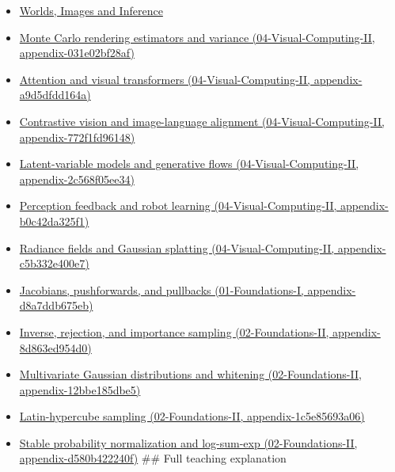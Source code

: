 \begin{itemize}
\item
  \href{Continuous\%20Notes/University\%20-\%20Worlds,\%20Images\%20and\%20Inference\%20-\%20Graphics,\%20Vision\%20and\%20Photography}{Worlds, Images and Inference}
\item
  \href{../04-Visual-Computing-II/main.pdf\#nameddest=appendix-031e02bf28af}{Monte Carlo rendering estimators and variance (04-Visual-Computing-II, appendix-031e02bf28af)}
\item
  \href{../04-Visual-Computing-II/main.pdf\#nameddest=appendix-a9d5dfdd164a}{Attention and visual transformers (04-Visual-Computing-II, appendix-a9d5dfdd164a)}
\item
  \href{../04-Visual-Computing-II/main.pdf\#nameddest=appendix-772f1fd96148}{Contrastive vision and image-language alignment (04-Visual-Computing-II, appendix-772f1fd96148)}
\item
  \href{../04-Visual-Computing-II/main.pdf\#nameddest=appendix-2c568f05ee34}{Latent-variable models and generative flows (04-Visual-Computing-II, appendix-2c568f05ee34)}
\item
  \href{../04-Visual-Computing-II/main.pdf\#nameddest=appendix-b0c42da325f1}{Perception feedback and robot learning (04-Visual-Computing-II, appendix-b0c42da325f1)}
\item
  \href{../04-Visual-Computing-II/main.pdf\#nameddest=appendix-c5b332e400e7}{Radiance fields and Gaussian splatting (04-Visual-Computing-II, appendix-c5b332e400e7)}
\item
  \href{../01-Foundations-I/main.pdf\#nameddest=appendix-d8a7ddb675eb}{Jacobians, pushforwards, and pullbacks (01-Foundations-I, appendix-d8a7ddb675eb)}
\item
  \href{../02-Foundations-II/main.pdf\#nameddest=appendix-8d863ed954d0}{Inverse, rejection, and importance sampling (02-Foundations-II, appendix-8d863ed954d0)}
\item
  \href{../02-Foundations-II/main.pdf\#nameddest=appendix-12bbe185dbe5}{Multivariate Gaussian distributions and whitening (02-Foundations-II, appendix-12bbe185dbe5)}
\item
  \href{../02-Foundations-II/main.pdf\#nameddest=appendix-1c5e85693a06}{Latin-hypercube sampling (02-Foundations-II, appendix-1c5e85693a06)}
\item
  \href{../02-Foundations-II/main.pdf\#nameddest=appendix-d580b422240f}{Stable probability normalization and log-sum-exp (02-Foundations-II, appendix-d580b422240f)} \#\# Full teaching explanation
\end{itemize}

